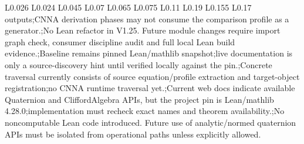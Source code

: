 \begin{longtable}{L{0.026\linewidth} L{0.024\linewidth} L{0.045\linewidth} L{0.07\linewidth} L{0.065\linewidth} L{0.075\linewidth} L{0.11\linewidth} L{0.19\linewidth} L{0.155\linewidth} L{0.17\linewidth}}
outputs;\newline CNNA derivation phases may not consume the comparison profile as a generator.;\newline No Lean refactor in V1.25. Future module changes require import graph check, consumer discipline audit and full local Lean build evidence.;\newline Baseline remains pinned Lean/\allowbreak{}mathlib snapshot;\newline live documentation is only a source-discovery hint until verified locally against the pin.;\newline Concrete traversal currently consists of source equation/\allowbreak{}profile extraction and target-object registration;\newline no CNNA runtime traversal yet.;\newline Current web docs indicate available Quaternion and CliffordAlgebra APIs, but the project pin is Lean/\allowbreak{}mathlib 4.28.0;\newline implementation must recheck exact names and theorem availability.;\newline No noncomputable Lean code introduced. Future use of analytic/\allowbreak{}normed quaternion APIs must be isolated from operational paths unless explicitly allowed.\\
\hline
\addlinespace[0.24em]

\end{longtable}
